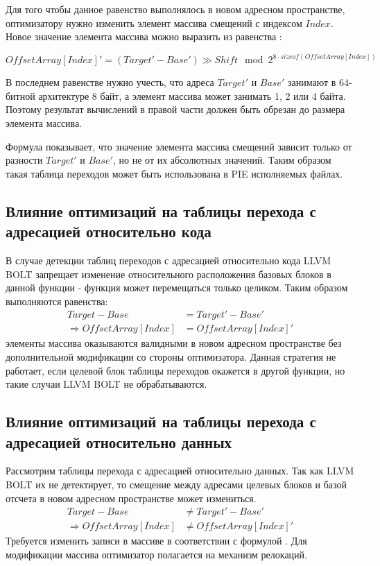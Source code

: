 \documentclass{mipt-thesis-bs}
\begin{document}
    Для того чтобы данное равенство выполнялось в новом адресном пространстве, оптимизатору нужно изменить элемент массива смещений с индексом $Index$. Новое значение элемента массива можно выразить из равенства :

    \begin{equation}
        OffsetArray[Index]' = (Target' - Base') \gg Shift \mod 2^{8 \cdot sizeof(OffsetArray[Index])}
        \label{eq:offset'}
    \end{equation}

    В последнем равенстве нужно учесть, что адреса $Target'$ и $Base'$ занимают в 64-битной архитектуре 8 байт, а элемент массива может занимать 1, 2 или 4 байта. Поэтому результат вычислений в правой части должен быть обрезан до размера элемента массива.

    Формула  показывает, что значение элемента массива смещений зависит только от разности $Target'$ и $Base'$, но не от их абсолютных значений. Таким образом такая таблица переходов может быть использована в PIE исполняемых файлах.

    \subsection{Влияние оптимизаций на таблицы перехода с адресацией относительно кода}

    В случае детекции таблиц переходов с адресацией относительно кода LLVM BOLT запрещает изменение относительного расположения базовых блоков в данной функции - функция может перемещаться только целиком. Таким образом выполняются равенства:
    \begin{align*}
        Target - Base &= Target' - Base'\\
        \Rightarrow OffsetArray[Index] &= OffsetArray[Index]'
    \end{align*}
    элементы массива оказываются валидными в новом адресном пространстве без дополнительной модификации со стороны оптимизатора. Данная стратегия не работает, если целевой блок таблицы переходов окажется в другой функции, но такие случаи LLVM BOLT не обрабатываются.

    \subsection{Влияние оптимизаций на таблицы перехода с адресацией относительно данных}

    Рассмотрим таблицы перехода с адресацией относительно данных. Так как LLVM BOLT их не детектирует, то смещение между адресами целевых блоков и базой отсчета в новом адресном пространстве может измениться.
    \begin{align*}
        Target - Base &\neq Target' - Base'\\
        \Rightarrow OffsetArray[Index] &\neq OffsetArray[Index]'
    \end{align*}
    Требуется изменить записи в массиве в соответствии с формулой . Для модификации массива оптимизатор полагается на механизм релокаций.
\end{document}
